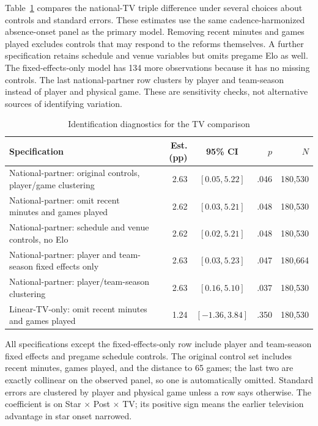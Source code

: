 \documentclass[11pt]{article}
\begin{document}
Table~\ref{tab:idadjust} compares the national-TV triple difference under several choices about controls and standard errors. These estimates use the same cadence-harmonized absence-onset panel as the primary model. Removing recent minutes and games played excludes controls that may respond to the reforms themselves. A further specification retains schedule and venue variables but omits pregame Elo as well. The fixed-effects-only model has 134 more observations because it has no missing controls. The last national-partner row clusters by player and team-season instead of player and physical game. These are sensitivity checks, not alternative sources of identifying variation.

\begin{table}[!htbp]\centering
\caption{Identification diagnostics for the TV comparison}\label{tab:idadjust}
\small\setlength{\tabcolsep}{4pt}
\begin{tabular}{@{}p{7.0cm}rcrr@{}}\toprule
Specification & Est. (pp) & 95\% CI & $p$ & $N$\\\midrule
National-partner: original controls, player/game clustering & 2.63 & $[0.05,5.22]$ & .046 & 180,530\\
National-partner: omit recent minutes and games played & 2.62 & $[0.03,5.21]$ & .048 & 180,530\\
National-partner: schedule and venue controls, no Elo & 2.62 & $[0.02,5.21]$ & .048 & 180,530\\
National-partner: player and team-season fixed effects only & 2.63 & $[0.03,5.23]$ & .047 & 180,664\\
National-partner: player/team-season clustering & 2.63 & $[0.16,5.10]$ & .037 & 180,530\\
Linear-TV-only: omit recent minutes and games played & 1.24 & $[-1.36,3.84]$ & .350 & 180,530\\\bottomrule
\end{tabular}\par\smallskip\raggedright\footnotesize All specifications except the fixed-effects-only row include player and team-season fixed effects and pregame schedule controls. The original control set includes recent minutes, games played, and the distance to 65 games; the last two are exactly collinear on the observed panel, so one is automatically omitted. Standard errors are clustered by player and physical game unless a row says otherwise. The coefficient is on Star $\times$ Post $\times$ TV; its positive sign means the earlier television advantage in star onset narrowed.
\end{table}
\end{document}
